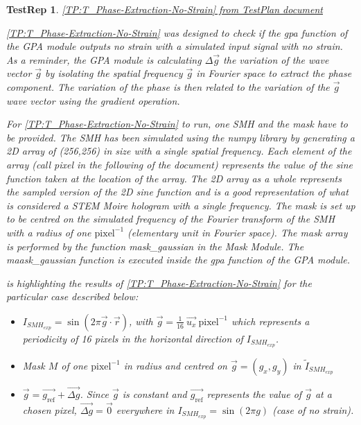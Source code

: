 \documentclass[12pt, titlepage]{article}
\newtheorem{TestRep}{TestRep}
\begin{document}
\begin{TestRep}\normalfont\underline{{\cref{TP:T_Phase-Extraction-No-Strain} 
from TestPlan document}} \label{Test_Report_2} \newline

\cref{TP:T_Phase-Extraction-No-Strain} was designed to check if the gpa function 
of the GPA module outputs no strain with a simulated input signal with no 
strain. As a reminder, the GPA module is calculating $\Delta \overrightarrow{g}$ 
the variation of the wave vector $\overrightarrow{g}$ by isolating the spatial 
frequency $\overrightarrow{g}$ in Fourier space to extract the phase component. 
The variation of the phase is then related to the variation of the 
$\overrightarrow{g}$ wave vector using the gradient operation. \medskip

For \cref{TP:T_Phase-Extraction-No-Strain} to run, one SMH and the mask have to 
be provided. The SMH has been simulated using the numpy library by generating a 
2D array of (256,256) in size with a single spatial frequency. Each element of 
the array (call pixel in the following of the document) represents the value of 
the sine function taken at the location of the array. The 2D array as a whole 
represents the sampled version of the 2D sine function and is a good 
representation of what is considered a STEM Moire hologram with a single 
frequency. The mask is set up to be centred on the simulated frequency of the 
Fourier transform of the SMH with a radius of one $\text{pixel}^{-1}$ 
(elementary unit in Fourier space). The mask array is performed by the function 
mask{\_}gaussian in the Mask Module. The maask{\_}gaussian function is executed 
inside the gpa function of the GPA module. \medskip

 is highlighting the results of 
\cref{TP:T_Phase-Extraction-No-Strain} for the particular case described below:
\begin{itemize}
\item $I_{SMH_{exp}}=\sin{(2\pi \overrightarrow{g}\cdot\overrightarrow{r})}$, 
with $\overrightarrow{g} = \frac{1}{16} \ \overrightarrow{u_x} \ 
\text{pixel}^{-1}$ which represents a periodicity of 16 pixels in the horizontal 
direction of $I_{SMH_{exp}}$. 
\item Mask $M$ of one $\text{pixel}^{-1}$ in radius and centred on 
$\overrightarrow{g}=(g_x,g_y)$ in $\widetilde{I}_{SMH_{exp}}$
\item $\overrightarrow{g} = \overrightarrow{g_\text{ref}} + 
\overrightarrow{\Delta g}$. Since $\overrightarrow{g}$ is constant and 
$\overrightarrow{g_\text{ref}}$ represents the value of $\overrightarrow{g}$ at 
a chosen pixel, $\overrightarrow{\Delta g} = \overrightarrow{0}$ everywhere in 
$I_{SMH_{exp}}=\sin{(2\pi g)}$ (case of no strain).
\end{itemize}


\end{TestRep}
\end{document}
